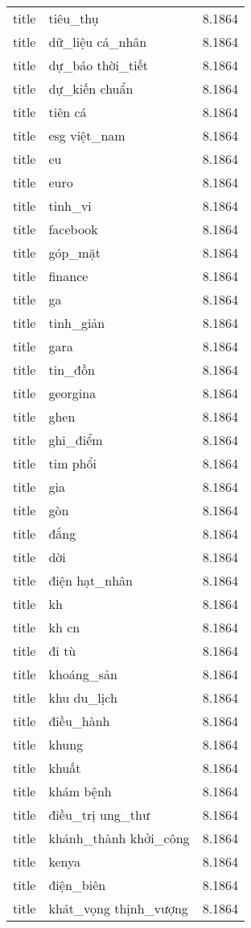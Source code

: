\documentclass{article}
\begin{document}
\begin{tabular}{lll}
title & tiêu\_thụ & 8.1864\\
title & dữ\_liệu cá\_nhân & 8.1864\\
title & dự\_báo thời\_tiết & 8.1864\\
title & dự\_kiến chuẩn & 8.1864\\
title & tiên cá & 8.1864\\
title & esg việt\_nam & 8.1864\\
title & eu & 8.1864\\
title & euro & 8.1864\\
title & tinh\_vi & 8.1864\\
title & facebook & 8.1864\\
title & góp\_mặt & 8.1864\\
title & finance & 8.1864\\
title & ga & 8.1864\\
title & tinh\_giản & 8.1864\\
title & gara & 8.1864\\
title & tin\_đồn & 8.1864\\
title & georgina & 8.1864\\
title & ghen & 8.1864\\
title & ghi\_điểm & 8.1864\\
title & tim phổi & 8.1864\\
title & gia & 8.1864\\
title & gòn & 8.1864\\
title & đắng & 8.1864\\
title & dời & 8.1864\\
title & điện hạt\_nhân & 8.1864\\
title & kh & 8.1864\\
title & kh cn & 8.1864\\
title & đi tù & 8.1864\\
title & khoáng\_sản & 8.1864\\
title & khu du\_lịch & 8.1864\\
title & điều\_hành & 8.1864\\
title & khung & 8.1864\\
title & khuất & 8.1864\\
title & khám bệnh & 8.1864\\
title & điều\_trị ung\_thư & 8.1864\\
title & khánh\_thành khởi\_công & 8.1864\\
title & kenya & 8.1864\\
title & điện\_biên & 8.1864\\
title & khát\_vọng thịnh\_vượng & 8.1864\\

\end{tabular}
\end{document}
